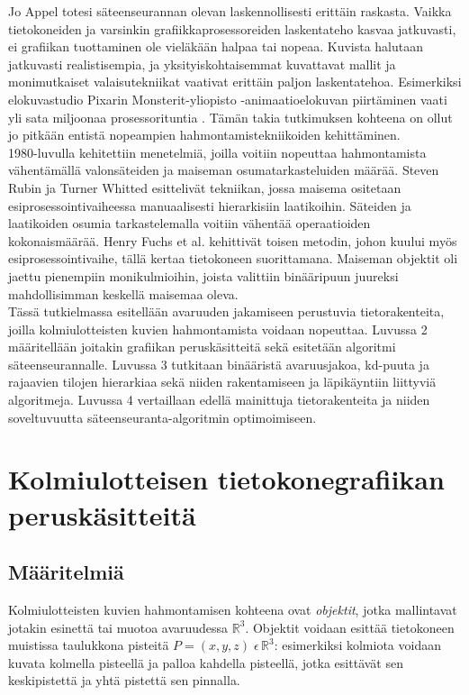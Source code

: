 ﻿\documentclass[a4paper, 12pt, titlepage]{article}
\newcommand{\R}{\mathbb{R}}
\begin{document}
Jo Appel totesi säteenseurannan olevan laskennollisesti erittäin raskasta. Vaikka tietokoneiden ja varsinkin grafiikkaprosessoreiden laskentateho kasvaa jatkuvasti, ei grafiikan tuottaminen ole vieläkään halpaa tai nopeaa. Kuvista halutaan jatkuvasti realistisempia, ja yksityiskohtaisemmat kuvattavat mallit ja monimutkaiset valaisutekniikat vaativat erittäin paljon laskentatehoa. Esimerkiksi elokuvastudio Pixarin Monsterit-yliopisto -animaatioelokuvan piirtäminen vaati yli sata miljoonaa prosessorituntia \citep{monsterit}. Tämän takia tutkimuksen kohteena on ollut jo pitkään entistä nopeampien hahmontamistekniikoiden kehittäminen.\\

1980-luvulla kehitettiin menetelmiä, joilla voitiin nopeuttaa hahmontamista vähentämällä valonsäteiden ja maiseman osumatarkasteluiden määrää. Steven Rubin ja Turner Whitted esittelivät tekniikan, jossa maisema ositetaan esiprosessointivaiheessa manuaalisesti hierarkisiin laatikoihin. Säteiden ja laatikoiden osumia tarkastelemalla voitiin vähentää operaatioiden kokonaismäärää. \citep[.]{rubin} Henry Fuchs et al. kehittivät toisen metodin, johon kuului myös esiprosessointivaihe, tällä kertaa tietokoneen suorittamana. Maiseman objektit oli jaettu pienempiin monikulmioihin, joista valittiin binääripuun juureksi mahdollisimman keskellä maisemaa oleva. \citep[.]{fuchs}\\

Tässä tutkielmassa esitellään avaruuden jakamiseen perustuvia tietorakenteita, joilla kolmiulotteisten kuvien hahmontamista voidaan nopeuttaa. Luvussa 2 määritellään joitakin grafiikan peruskäsitteitä sekä esitetään algoritmi säteenseurannalle. Luvussa 3 tutkitaan binääristä avaruusjakoa, kd-puuta ja rajaavien tilojen hierarkiaa sekä niiden rakentamiseen ja läpikäyntiin liittyviä algoritmeja. Luvussa 4 vertaillaan edellä mainittuja tietorakenteita ja niiden soveltuvuutta säteenseuranta-algoritmin optimoimiseen.


\newpage
\section{Kolmiulotteisen tietokonegrafiikan peruskäsitteitä}
\subsection{Määritelmiä}

Kolmiulotteisten kuvien hahmontamisen kohteena ovat \emph{objektit}, jotka mallintavat jotakin esinettä tai muotoa avaruudessa $\R^3$. Objektit voidaan esittää tietokoneen muistissa taulukkona pisteitä $P=(x,y,z)\;\epsilon\,\R^3$: esimerkiksi kolmiota voidaan kuvata kolmella pisteellä ja palloa kahdella pisteellä, jotka esittävät sen keskipistettä ja yhtä pistettä sen pinnalla. \citep[.]{angel}\\
\end{document}
